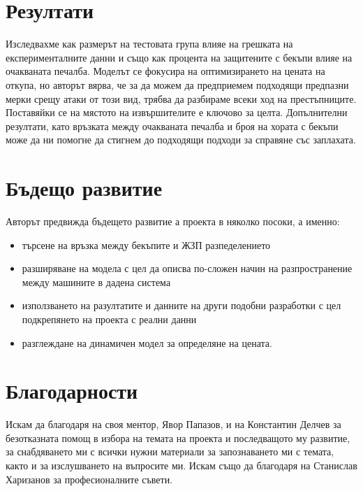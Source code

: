 \documentclass[11pt, a4paper]{article}
\theoremstyle{definition}
\begin{document}
\section{Резултати}
	Изследвахме как размерът на тестовата група влияе на грешката на експерименталните данни и също как процента на защитените с бекъпи влияе на очакваната печалба. Моделът се фокусира на оптимизирането на цената на откупа, но авторът вярва, че за да можем да предприемем подходящи предпазни мерки срещу атаки от този вид, трябва да разбираме всеки ход на престъпниците. Поставяйки се на мястото на извършителите е ключово за целта. Допълнителни резултати, като връзката между очакваната печалба и броя на хората с бекъпи може да ни помогне да стигнем до подходящи подходи за справяне със заплахата.
\section{Бъдещо развитие}
	Авторът предвижда бъдещето развитие а проекта в няколко посоки, а именно:
	\begin{itemize}
		\item търсене на връзка между бекъпите и ЖЗП разпеделението
		\item разширяване на модела с цел да описва по-сложен начин на разпространение между машините в дадена система
		\item използването на разултатите и данните на други подобни разработки с цел подкрепянето на проекта с реални данни\cite{paquet2019ransomware}
		\item разглеждане на динамичен модел за определяне на цената.
	\end{itemize}
\section{Благодарности}
Искам да благодаря на своя ментор, Явор Папазов, и на Константин Делчев за безотказната помощ в избора на темата на проекта и последващото му развитие, за снабдяването ми с всички нужни материали за запознаването ми с темата, както и за изслушването на въпросите ми. Искам също да благодаря на Станислав Харизанов за професионалните съвети.
\nocite{*}


\end{document}
